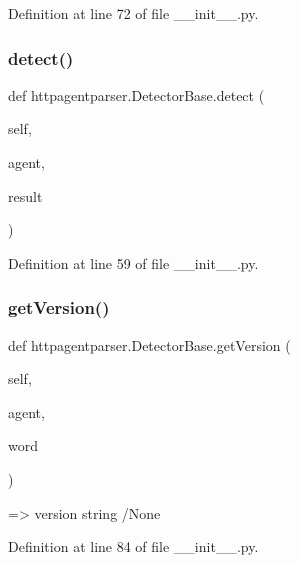 Definition at line 72 of file \+\_\+\+\_\+init\+\_\+\+\_\+.\+py.

\hypertarget{classhttpagentparser_1_1_detector_base_ab36e580d28b952b6a56b2eddeea5d845}{}\label{classhttpagentparser_1_1_detector_base_ab36e580d28b952b6a56b2eddeea5d845} 
\subsubsection{\texorpdfstring{detect()}{detect()}}
{\footnotesize\ttfamily def httpagentparser.\+Detector\+Base.\+detect (\begin{DoxyParamCaption}\item[{}]{self,  }\item[{}]{agent,  }\item[{}]{result }\end{DoxyParamCaption})}



Definition at line 59 of file \+\_\+\+\_\+init\+\_\+\+\_\+.\+py.

\hypertarget{classhttpagentparser_1_1_detector_base_a06cd51717213a696fd3c096de2a0ed3c}{}\label{classhttpagentparser_1_1_detector_base_a06cd51717213a696fd3c096de2a0ed3c} 
\subsubsection{\texorpdfstring{get\+Version()}{getVersion()}}
{\footnotesize\ttfamily def httpagentparser.\+Detector\+Base.\+get\+Version (\begin{DoxyParamCaption}\item[{}]{self,  }\item[{}]{agent,  }\item[{}]{word }\end{DoxyParamCaption})}

\begin{DoxyVerb}=> version string /None
\end{DoxyVerb}
 

Definition at line 84 of file \+\_\+\+\_\+init\+\_\+\+\_\+.\+py.



